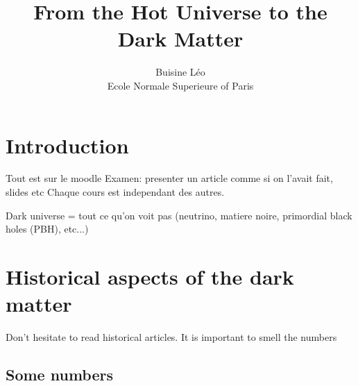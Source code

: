 \documentclass[a4paper]{book}
\theoremstyle{definition}
\theoremstyle{remark}
\begin{document}
\title{From the Hot Universe to the Dark Matter}
\author{Buisine Léo\\Ecole Normale Superieure of Paris}
\maketitle

\tableofcontents

\chapter{Introduction}

Tout est sur le moodle \newline 
Examen: presenter un article comme si on l'avait fait, slides etc \newline 
Chaque cours est independant des autres. \par \medskip 

Dark universe = tout ce qu'on voit pas (neutrino, matiere noire, primordial black holes (PBH), etc...)

\chapter{Historical aspects of the dark matter}

Don't hesitate to read historical articles. \newline
It is important to smell the numbers \par \medskip 

\section{Some numbers}
\end{document}
